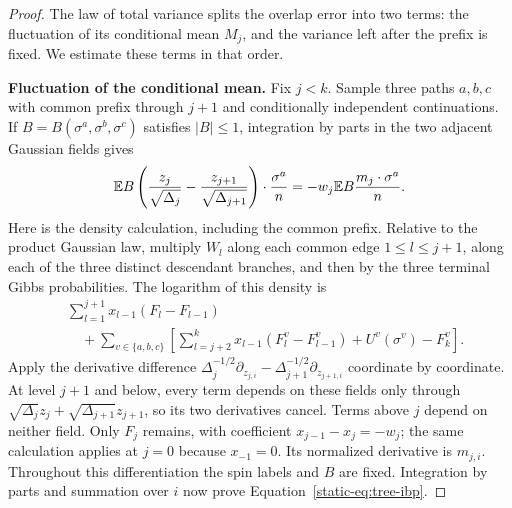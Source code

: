 \begin{proof}
The law of total variance splits the overlap error into two terms:
the fluctuation of its conditional mean $M_j$, and the variance left
after the prefix is fixed. We estimate these terms in that order.

\par\medskip\noindent\textbf{Fluctuation of the conditional mean.}\enspace
Fix $j<k$. Sample three paths $a,b,c$ with common prefix through
$j+1$ and conditionally independent continuations. If
$B=B(\sigma^a,\sigma^b,\sigma^c)$ satisfies $|B|\le1$, integration
by parts in the two adjacent Gaussian fields gives
\begin{equation}\label{static-eq:tree-ibp}
 \mathbb E B\left(\frac{z_j}{\sqrt{\Delta_j}}
           -\frac{z_{j+1}}{\sqrt{\Delta_{j+1}}}\right)
                    \cdot\frac{\sigma^a}{n}
 =-w_j\mathbb E B\frac{m_j\cdot\sigma^a}{n}.
\end{equation}
Here is the density calculation, including the common prefix. Relative
to the product Gaussian law, multiply $W_l$ along each common edge
$1\le l\le j+1$, along each of the three distinct descendant
branches, and then by the three terminal Gibbs probabilities. The
logarithm of this density is
\begin{align*}
 &\sum_{l=1}^{j+1}x_{l-1}(F_l-F_{l-1})\\
 &\quad+\sum_{v\in\{a,b,c\}}\left[
       \sum_{l=j+2}^kx_{l-1}(F_l^v-F_{l-1}^v)
                         +U^v(\sigma^v)-F_k^v\right].
\end{align*}
Apply the derivative difference
$\Delta_j^{-1/2}\partial_{z_{j,i}}
-\Delta_{j+1}^{-1/2}\partial_{z_{j+1,i}}$ coordinate by coordinate.
At level $j+1$ and below, every term depends on these fields only
through $\sqrt{\Delta_j}z_j+\sqrt{\Delta_{j+1}}z_{j+1}$, so its
two derivatives cancel. Terms above $j$ depend on neither field.
Only $F_j$ remains, with coefficient $x_{j-1}-x_j=-w_j$; the same
calculation applies at $j=0$ because $x_{-1}=0$. Its normalized
derivative is $m_{j,i}$. Throughout this differentiation the spin
labels and $B$ are fixed. Integration by parts and summation over
$i$ now prove Equation~\eqref{static-eq:tree-ibp}.


\end{proof}

